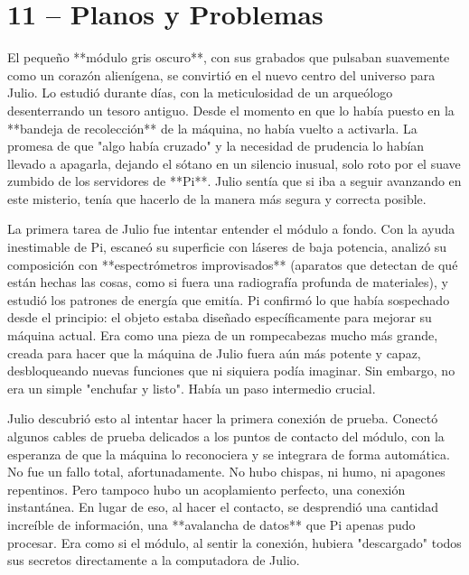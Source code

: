 \documentclass[a4paper,12pt]{book}
\begin{document}
\cleardoublepage %

\chapter*{11 – Planos y Problemas}

El pequeño **módulo gris oscuro**, con sus grabados que pulsaban suavemente como un corazón alienígena, se convirtió en el nuevo centro del universo para Julio. Lo estudió durante días, con la meticulosidad de un arqueólogo desenterrando un tesoro antiguo. Desde el momento en que lo había puesto en la **bandeja de recolección** de la máquina, no había vuelto a activarla. La promesa de que "algo había cruzado" y la necesidad de prudencia lo habían llevado a apagarla, dejando el sótano en un silencio inusual, solo roto por el suave zumbido de los servidores de **Pi**. Julio sentía que si iba a seguir avanzando en este misterio, tenía que hacerlo de la manera más segura y correcta posible.

La primera tarea de Julio fue intentar entender el módulo a fondo. Con la ayuda inestimable de Pi, escaneó su superficie con láseres de baja potencia, analizó su composición con **espectrómetros improvisados** (aparatos que detectan de qué están hechas las cosas, como si fuera una radiografía profunda de materiales), y estudió los patrones de energía que emitía. Pi confirmó lo que había sospechado desde el principio: el objeto estaba diseñado específicamente para mejorar su máquina actual. Era como una pieza de un rompecabezas mucho más grande, creada para hacer que la máquina de Julio fuera aún más potente y capaz, desbloqueando nuevas funciones que ni siquiera podía imaginar. Sin embargo, no era un simple "enchufar y listo". Había un paso intermedio crucial.

Julio descubrió esto al intentar hacer la primera conexión de prueba. Conectó algunos cables de prueba delicados a los puntos de contacto del módulo, con la esperanza de que la máquina lo reconociera y se integrara de forma automática. No fue un fallo total, afortunadamente. No hubo chispas, ni humo, ni apagones repentinos. Pero tampoco hubo un acoplamiento perfecto, una conexión instantánea. En lugar de eso, al hacer el contacto, se desprendió una cantidad increíble de información, una **avalancha de datos** que Pi apenas pudo procesar. Era como si el módulo, al sentir la conexión, hubiera "descargado" todos sus secretos directamente a la computadora de Julio.
\end{document}
